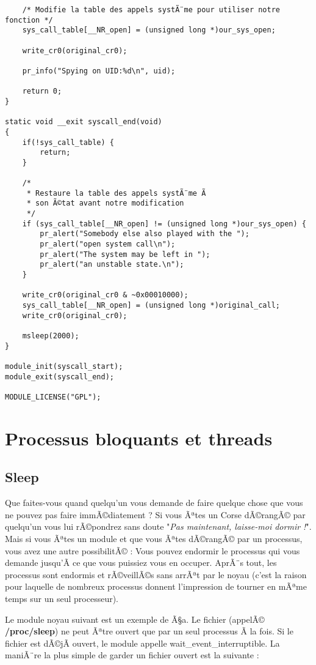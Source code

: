 \documentclass[11pt]{article}
\begin{document}
\begin{verbatim}
    /* Modifie la table des appels systÃ¨me pour utiliser notre fonction */
    sys_call_table[__NR_open] = (unsigned long *)our_sys_open;

    write_cr0(original_cr0);

    pr_info("Spying on UID:%d\n", uid);

    return 0;
}

static void __exit syscall_end(void)
{
    if(!sys_call_table) {
        return;
    }

    /*
     * Restaure la table des appels systÃ¨me Ã
     * son Ã©tat avant notre modification
     */
    if (sys_call_table[__NR_open] != (unsigned long *)our_sys_open) {
        pr_alert("Somebody else also played with the ");
        pr_alert("open system call\n");
        pr_alert("The system may be left in ");
        pr_alert("an unstable state.\n");
    }

    write_cr0(original_cr0 & ~0x00010000);
    sys_call_table[__NR_open] = (unsigned long *)original_call;
    write_cr0(original_cr0);

    msleep(2000);
}

module_init(syscall_start);
module_exit(syscall_end);

MODULE_LICENSE("GPL");
\end{verbatim}

\section*{Processus bloquants et threads}
\label{sec-11}
\subsection*{Sleep}
\label{sec-11-1}
Que faites-vous quand quelqu'un vous demande de faire quelque chose que vous ne pouvez pas faire immÃ©diatement ? Si vous Ãªtes un Corse dÃ©rangÃ© par quelqu'un vous lui rÃ©pondrez sans doute "\emph{Pas maintenant, laisse-moi dormir !}". Mais si vous Ãªtes un module et que vous Ãªtes dÃ©rangÃ© par un processus, vous avez une autre possibilitÃ© : Vous pouvez endormir le processus qui vous demande jusqu'Ã  ce que vous puissiez vous en occuper. AprÃ¨s tout, les processus sont endormis et rÃ©veillÃ©s sans arrÃªt par le noyau (c'est la raison pour laquelle de nombreux processus donnent l'impression de tourner en mÃªme temps sur un seul processeur).

Le module noyau suivant est un exemple de Ã§a. Le fichier (appelÃ© \textbf{/proc/sleep}) ne peut Ãªtre ouvert que par un seul processus Ã  la fois. Si le fichier est dÃ©jÃ  ouvert, le module appelle wait\_event\_interruptible. La maniÃ¨re la plus simple de garder un fichier ouvert est la suivante :
\end{document}

